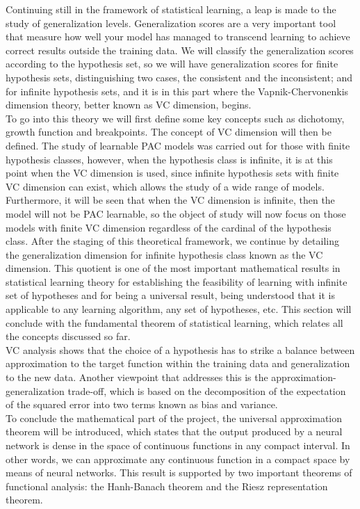     Continuing still in the framework of statistical learning, a leap is made to the study of generalization levels. Generalization scores are a very important tool that measure how well your model has managed to transcend learning to achieve correct results outside the training data. We will classify the generalization scores according to the hypothesis set, so we will have generalization scores for finite hypothesis sets, distinguishing two cases, the consistent and the inconsistent; and for infinite hypothesis sets, and it is in this part where the Vapnik-Chervonenkis dimension theory, better known as VC dimension, begins. \\
    
    To go into this theory we will first define some key concepts such as dichotomy, growth function and breakpoints. The concept of VC dimension will then be defined. The study of learnable PAC models was carried out for those with finite hypothesis classes, however, when the hypothesis class is infinite, it is at this point when the VC dimension is used, since infinite hypothesis sets with finite VC dimension can exist, which allows the study of a wide range of models. Furthermore, it will be seen that when the VC dimension is infinite, then the model will not be PAC learnable, so the object of study will now focus on those models with finite VC dimension regardless of the cardinal of the hypothesis class. After the staging of this theoretical framework, we continue by detailing the generalization dimension for infinite hypothesis class known as the VC dimension. This quotient is one of the most important mathematical results in statistical learning theory for establishing the feasibility of learning with infinite set of hypotheses and for being a universal result, being understood that it is applicable to any learning algorithm, any set of hypotheses, etc. This section will conclude with the fundamental theorem of statistical learning, which relates all the concepts discussed so far. \\
    
    VC analysis shows that the choice of a hypothesis has to strike a balance between approximation to the target function within the training data and generalization to the new data. Another viewpoint that addresses this is the approximation-generalization trade-off, which is based on the decomposition of the expectation of the squared error into two terms known as bias and variance. \\
    
    To conclude the mathematical part of the project, the universal approximation theorem will be introduced, which states that the output produced by a neural network is dense in the space of continuous functions in any compact interval. In other words, we can approximate any continuous function in a compact space by means of neural networks. This result is supported by two important theorems of functional analysis: the Hanh-Banach theorem and the Riesz representation theorem. \\
    
